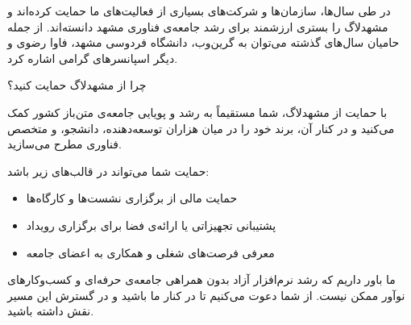 \documentclass[a4paper]{article}
\begin{document}
در طی سال‌ها، سازمان‌ها و شرکت‌های بسیاری از فعالیت‌های ما حمایت کرده‌اند و مشهدلاگ را بستری ارزشمند برای رشد جامعه‌ی فناوری مشهد دانسته‌اند.
از جمله حامیان سال‌های گذشته می‌توان به گرین‌وب، دانشگاه فردوسی مشهد، فاوا رضوی و دیگر اسپانسرهای گرامی اشاره کرد.

چرا از مشهدلاگ حمایت کنید؟

با حمایت از مشهدلاگ، شما مستقیماً به رشد و پویایی جامعه‌ی متن‌باز کشور کمک می‌کنید و در کنار آن، برند خود را در میان هزاران توسعه‌دهنده، دانشجو، و متخصص فناوری مطرح می‌سازید.

حمایت شما می‌تواند در قالب‌های زیر باشد:

\begin{itemize}
\item حمایت مالی از برگزاری نشست‌ها و کارگاه‌ها
\item پشتیبانی تجهیزاتی یا ارائه‌ی فضا برای برگزاری رویداد
\item معرفی فرصت‌های شغلی و همکاری به اعضای جامعه
\end{itemize}

ما باور داریم که رشد نرم‌افزار آزاد بدون همراهی جامعه‌ی حرفه‌ای و کسب‌وکارهای نوآور ممکن نیست.
از شما دعوت می‌کنیم تا در کنار ما باشید و در گسترش این مسیر نقش داشته باشید.
\end{document}
